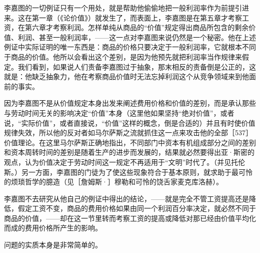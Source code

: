 李嘉图的一切例证只有一个用处，就是帮助他偷偷地把一般利润率作为前提引进来。这在第一章（《论价值》）就发生了，而表面上，李嘉图是在第五章才考察工资，在第六章才考察利润。怎样单纯从商品的“价值”规定得出商品所包含的剩余价值、利润、甚至一般利润率，——这一点对李嘉图来说仍然是一个秘密。他在上述例证中实际证明的唯一东西是：商品的价格只要决定于一般利润率，它就根本不同于商品的价值。他所以会看出这个差别，是因为他预先就把利润率当作规律来假定。我们看到，如果说人们责备李嘉图过于抽象，那末相反的责备倒是公正的，这就是：他缺乏抽象力，他在考察商品价值时无法忘掉利润这个从竞争领域来到他面前的事实。

因为李嘉图不是从价值规定本身出发来阐述费用价格和价值的差别，而是承认那些与劳动时间无关的影响决定“价值”本身（这里他如果坚持“绝对价值”，或者说，“实际价值”，或者直接说，“价值”这样的概念，倒是合适的）并且有时使价值规律失效，所以他的反对者如马尔萨斯之流就抓住这一点来攻击他的全部［537］价值理论。在这里马尔萨斯正确地指出，不同部门中资本有机组成部分之间的差别和资本周转时间的差别是随着生产的进步而发展的，结果就必然要得出亚·斯密的观点，认为价值决定于劳动时间这一规定不再适用于“文明”时代了。（并见托伦斯。）另一方面，李嘉图的门徒为了使这些现象符合于基本原则，就求助于最可怜的烦琐哲学的臆造（见［詹姆斯·］穆勒和可怜的饶舌家麦克库洛赫）。

李嘉图不去研究从他自己的例证中得出的结论，——就是完全不管工资提高还是降低，假定工资不变，商品的费用价格如果由同一个利润百分率决定，就必然不同于商品的价值，——却在这一节里转而考察工资的提高或降低对那已经由价值平均化而成的费用价格所产生的影响。

问题的实质本身是非常简单的。

